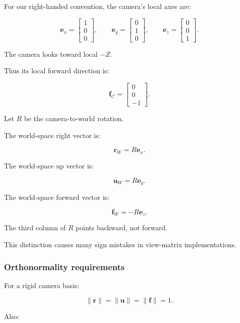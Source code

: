 For our right-handed convention, the camera's local axes are:

\[
 \mathbf e_x= \begin{bmatrix}1\\0\\0\end{bmatrix}, \qquad \mathbf e_y= \begin{bmatrix}0\\1\\0\end{bmatrix}, \qquad \mathbf e_z= \begin{bmatrix}0\\0\\1\end{bmatrix}.
\]

The camera looks toward local \(-Z\).

Thus its local forward direction is:

\[
 \boxed{ \mathbf f_C= \begin{bmatrix}0\\0\\-1\end{bmatrix} }.
\]

Let \(R\) be the camera-to-world rotation.

The world-space right vector is:

\[
 \boxed{ \mathbf r_W=R\mathbf e_x }.
\]

The world-space up vector is:

\[
 \boxed{ \mathbf u_W=R\mathbf e_y }.
\]

The world-space forward vector is:

\[
 \boxed{ \mathbf f_W=-R\mathbf e_z }.
\]

The third column of \(R\) points backward, not forward.

This distinction causes many sign mistakes in view-matrix implementations.

\subsubsection{Orthonormality requirements}\label{02-foundations-ii-ch032-orthonormality-requirements}

\hypertarget{02-foundations-ii-ch032-orthonormality-requirements}{}

For a rigid camera basis:

\[
 \|\mathbf r\|=\|\mathbf u\|=\|\mathbf f\|=1.
\]

Also:


